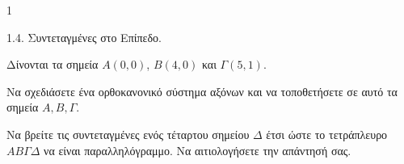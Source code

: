 \begin{ylh}{1}
    \item 1.4. Συντεταγμένες στο Επίπεδο.
\end{ylh}
Δίνονται τα σημεία $A(0,0)$, $B(4,0)$ και $\Gamma(5,1)$.
\begin{alist}
\item Να σχεδιάσετε ένα ορθοκανονικό σύστημα αξόνων και να τοποθετήσετε σε αυτό τα σημεία $A, B, \Gamma$.  
\item Να βρείτε τις συντεταγμένες ενός τέταρτου σημείου $\Delta$ έτσι ώστε το τετράπλευρο $AB\Gamma\Delta$ να είναι παραλληλόγραμμο. Να αιτιολογήσετε την απάντησή σας.  
\end{alist}